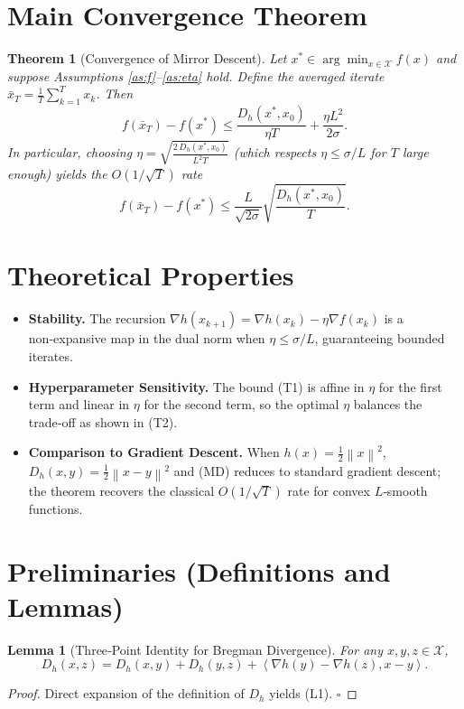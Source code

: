 \documentclass{article}
\newtheorem{theorem}{Theorem}
\newtheorem{lemma}{Lemma}
\newcommand{\norm}[1]{\left\lVert #1\right\rVert}
\newcommand{\ip}[2]{\left\langle #1,#2\right\rangle}
\newcommand{\D}[2]{D_h(#1,#2)}
\newcommand{\grad}[1]{\nabla #1}
\begin{document}
\section*{Main Convergence Theorem}
\begin{theorem}[Convergence of Mirror Descent]
\label{thm:md}
Let $x^*\in\arg\min_{x\in\mathcal{X}}f(x)$ and suppose Assumptions \ref{as:f}--\ref{as:eta} hold. Define the averaged iterate $\bar{x}_T=\frac1T\sum_{k=1}^{T}x_k$. Then
\[
f(\bar{x}_T)-f(x^*)\le
\frac{\D{x^*}{x_0}}{\eta T}
+\frac{\eta L^{2}}{2\sigma}.
\tag{T1}
\]
In particular, choosing $\eta=\sqrt{\frac{2\,\D{x^*}{x_0}}{L^{2}T}}$ (which respects $\eta\le\sigma/L$ for $T$ large enough) yields the $O(1/\sqrt{T})$ rate
\[
f(\bar{x}_T)-f(x^*)\le
\frac{L}{\sqrt{2\sigma}}\sqrt{\frac{\D{x^*}{x_0}}{T}}.
\tag{T2}
\]
\end{theorem}

\section*{Theoretical Properties}
\begin{itemize}
\item \textbf{Stability.} The recursion $\grad{h}(x_{k+1})=\grad{h}(x_k)-\eta\grad{f}(x_k)$ is a non‑expansive map in the dual norm when $\eta\le\sigma/L$, guaranteeing bounded iterates.
\item \textbf{Hyperparameter Sensitivity.} The bound (T1) is affine in $\eta$ for the first term and linear in $\eta$ for the second term, so the optimal $\eta$ balances the trade‑off as shown in (T2).
\item \textbf{Comparison to Gradient Descent.} When $h(x)=\frac12\norm{x}^{2}$, $\D{x}{y}=\frac12\norm{x-y}^{2}$ and (MD) reduces to standard gradient descent; the theorem recovers the classical $O(1/\sqrt{T})$ rate for convex $L$‑smooth functions.
\end{itemize}

\section*{Preliminaries (Definitions and Lemmas)}
\begin{lemma}[Three‑Point Identity for Bregman Divergence]
\label{lem:3pt}
For any $x,y,z\in\mathcal{X}$,
\[
\D{x}{z}= \D{x}{y}+ \D{y}{z}+ \ip{\grad{h}(y)-\grad{h}(z)}{x-y}.
\tag{L1}
\]
\end{lemma}
\begin{proof}
Direct expansion of the definition of $D_h$ yields (L1). \hfill $\square$
\end{proof}
\end{document}
